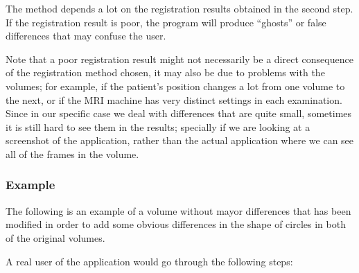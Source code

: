 The method depends a lot on the registration results obtained in the
second step. If the registration result is poor, the program will
produce ``ghosts'' or false differences that may confuse the user.

Note that a poor registration result might not necessarily be a direct
consequence of the registration method chosen, it may also be due to
problems with the volumes; for example, if the patient's position
changes a lot from one volume to the next, or if the MRI machine has
very distinct settings in each examination.\\

Since in our specific case we deal with differences that are quite
small, sometimes it is still hard to see them in the results;
specially if we are looking at a screenshot of the application, rather
than the actual application where we can see all of the frames in the
volume.

\subsubsection{Example}
The following is an example of a volume without mayor differences that
has been modified in order to add some obvious differences in the
shape of circles in both of the original volumes. 

A real user of the application would go through the following steps:

